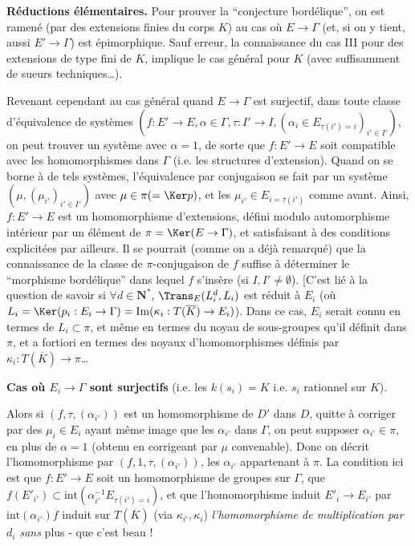 {\bf Réductions élémentaires.} Pour prouver la ``conjecture bordélique'', on est ramené (par des extensions finies du corps $K$) au cas où $E \to \Gamma$ (et, si on y tient, aussi $E' \to \Gamma$) est épimorphique. Sauf erreur, la connaissance du cas III pour des extensions de type fini de $K$, implique le cas général pour $K$ (avec suffisamment de sueurs techniques\dots).

Revenant cependant au cas général quand $E \to \Gamma$ est surjectif, dans toute classe d'équivalence de systèmes $(f: E' \to E, \alpha \in \Gamma, \tau: I' \to I, (\alpha_i \in E_{\tau(i') = i})_{i' \in I'})$, on peut trouver un système avec $\alpha = 1$, de sorte que $f: E' \to E$ soit compatible avec les homomorphismes dans $\Gamma$ (i.e. les structures d'extension). Quand on se borne à de tels systèmes, l'équivalence par conjugaison se fait par un système $(\mu, (\mu_{i'})_{i' \in I'})$ avec $\mu \in \pi (= \Ker p)$, et les $\mu_{i'} \in E_{i = \tau(i')}$ comme avant. Ainsi, $f: E' \to E$ est un homomorphisme d'extensions, défini modulo automorphisme intérieur par un élément de $\pi = \Ker (E \to \Gamma)$, et satisfaisant à des conditions explicitées par ailleurs. Il se pourrait (comme on a déjà remarqué) que la connaissance de la classe de $\pi$-conjugaison de $f$ suffise à déterminer le ``morphisme bordélique'' dans lequel $f$ s'insère (si $I, I' \neq \emptyset$). [C'est lié à la question de savoir si $\forall d \in \mathbf{N}^*$, $\Trans_E(L^d_i, L_i)$ est réduit à $E_i$ (où $L_i = \Ker (p_i: E_i \to \Gamma) = \text{Im}(\kappa_i: T(\overline{K}) \to E_i)$). Dans ce cas, $E_i$ serait connu en termes de $L_i \subset  \pi$, et même en termes du noyau de sous-groupes qu'il définit dans $\pi$, et a fortiori en termes des noyaux d'homomorphismes définis par $\kappa_i: T(\overline{K}) \to \pi$\dots

{\bf Cas où $E_i \to \Gamma$ sont surjectifs} (i.e. les $k(s_i) = K$ i.e. $s_i$ rationnel sur $K$).

Alors si $(f, \tau, (\alpha_{i'}))$ est un homomorphisme de $D'$ dans $D$, quitte à corriger par des $\mu_i \in E_i$ ayant même image que les $\alpha_{i'}$ dans $\Gamma$, on peut supposer $\alpha_{i'} \in \pi$, en plus de $\alpha = 1$ (obtenu en corrigeant par $\mu$ convenable). Donc on décrit l'homomorphisme par $(f, 1, \tau, (\alpha_{i'}))$, les $\alpha_{i'}$ appartenant à $\pi$. La condition ici est que $f: E' \to E$ soit un homomorphisme de groupes sur $\Gamma$, que $f(E'_{i'}) \subset  \text{int}(\alpha^{-1}_{i'} E_{\tau(i') = i})$, et que l'homomorphisme induit $E'_i \to E_{i'}$ par $\text{int}(\alpha_{i'}) f$ induit sur $T(\overline{K})$ (via $\kappa_{i'}, \kappa_i$) \emph{l'homomorphisme de multiplication par $d_i$ sans} plus - que c'est beau !


